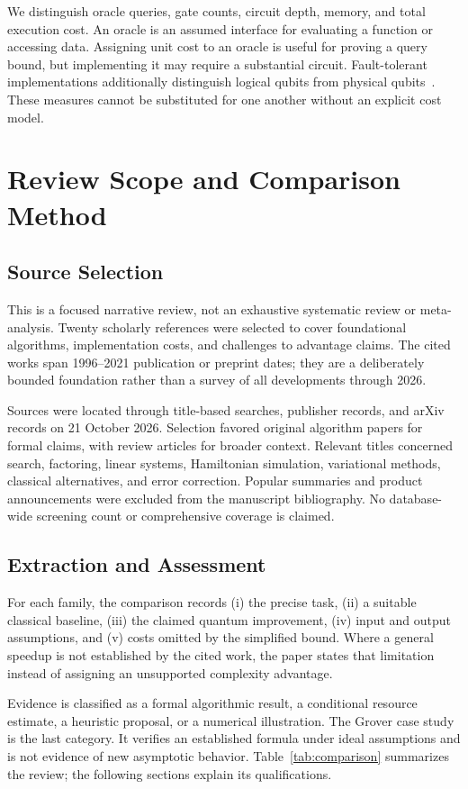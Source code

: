 \documentclass[conference]{IEEEtran}
\begin{document}
We distinguish oracle queries, gate counts, circuit depth, memory, and total execution cost. An oracle is an assumed interface for evaluating a function or accessing data. Assigning unit cost to an oracle is useful for proving a query bound, but implementing it may require a substantial circuit. Fault-tolerant implementations additionally distinguish logical qubits from physical qubits~\cite{fowler}. These measures cannot be substituted for one another without an explicit cost model.

\section{Review Scope and Comparison Method}
\subsection{Source Selection}
This is a focused narrative review, not an exhaustive systematic review or meta-analysis. Twenty scholarly references were selected to cover foundational algorithms, implementation costs, and challenges to advantage claims. The cited works span 1996--2021 publication or preprint dates; they are a deliberately bounded foundation rather than a survey of all developments through 2026.

Sources were located through title-based searches, publisher records, and arXiv records on 21 October 2026. Selection favored original algorithm papers for formal claims, with review articles for broader context. Relevant titles concerned search, factoring, linear systems, Hamiltonian simulation, variational methods, classical alternatives, and error correction. Popular summaries and product announcements were excluded from the manuscript bibliography. No database-wide screening count or comprehensive coverage is claimed.

\subsection{Extraction and Assessment}
For each family, the comparison records (i) the precise task, (ii) a suitable classical baseline, (iii) the claimed quantum improvement, (iv) input and output assumptions, and (v) costs omitted by the simplified bound. Where a general speedup is not established by the cited work, the paper states that limitation instead of assigning an unsupported complexity advantage.

Evidence is classified as a formal algorithmic result, a conditional resource estimate, a heuristic proposal, or a numerical illustration. The Grover case study is the last category. It verifies an established formula under ideal assumptions and is not evidence of new asymptotic behavior. Table~\ref{tab:comparison} summarizes the review; the following sections explain its qualifications.
\end{document}
